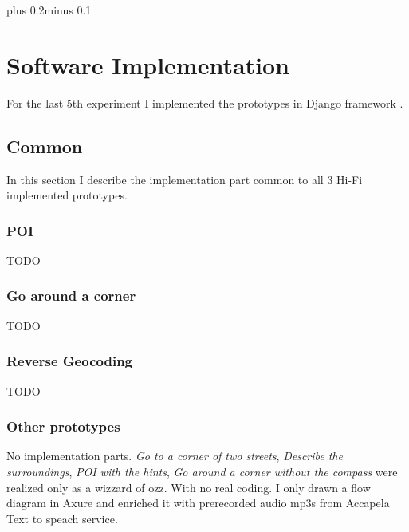 \documentclass[11pt,oneside,a4paper]{book}
\begin{document}
	\mainbodystarts
	\normalfont
	\baselineskip plus 0.2\baselineskip minus 0.1\baselineskip
	
	
	
	
	
	
	
	

	\chapter{Software Implementation}
		For the last 5th experiment I implemented the prototypes in  Django framework \cite{django}.
		\section{Common}
			In this section I describe the implementation part common to all 3 Hi-Fi implemented prototypes.
		
		
		\subsection{POI}
			TODO		
		\subsection{Go around a corner}
			TODO
		\subsection{Reverse Geocoding}
			TODO
			
		\subsection{Other prototypes}
			No implementation parts.
			\emph{Go to a corner of two streets}, 
			\emph{Describe the surroundings},
			\emph{POI with the hints},
			\emph{Go around a corner without the compass}
			 were realized only as a wizzard of ozz. With no real coding. I only drawn a flow diagram in Axure and enriched it with prerecorded audio mp3s from Accapela Text to speach service.
\end{document}
